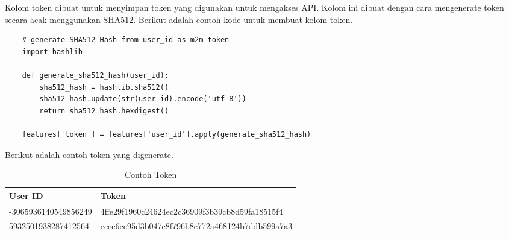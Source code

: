 Kolom token dibuat untuk menyimpan token yang digunakan untuk mengakses API. Kolom ini dibuat dengan cara mengenerate token secara acak menggunakan SHA512. Berikut adalah contoh kode untuk membuat kolom token.

\begin{lstlisting}
    # generate SHA512 Hash from user_id as m2m token
    import hashlib

    def generate_sha512_hash(user_id):
        sha512_hash = hashlib.sha512()
        sha512_hash.update(str(user_id).encode('utf-8'))
        return sha512_hash.hexdigest()

    features['token'] = features['user_id'].apply(generate_sha512_hash)
    \end{lstlisting}

Berikut adalah contoh token yang digenerate.

\begin{table}[H]
    \caption{Contoh Token}
    \begin{tabular}{|l|l|}
    \hline
    \textbf{User ID} & \textbf{Token} \\ \hline
    -3065936140549856249 & 4ffe29f1960c24624ec2c36909f3b39cb8d59fa18515f4 \\
    5932501938287412564 & ecee6cc95d3b047c8f796b8e772a468124b7ddb599a7a3 \\ \hline
    \end{tabular}
    \label{tab:token}
    \end{table}
